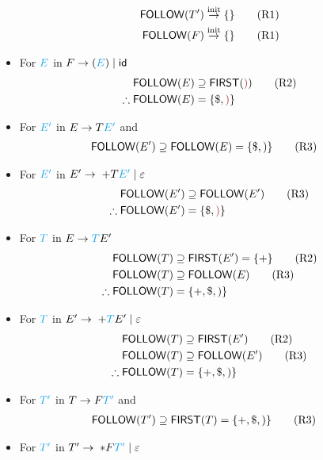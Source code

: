 \documentclass[10pt,a4paper,landscape]{article}
\begin{document}
\begin{multicols*}{3}
\begin{itemize}
\begin{align*}
    \mathsf{FOLLOW}(T') &\overset{\text{init}}{\to} \{\} \tag{R1} \\
    \mathsf{FOLLOW}(F) &\overset{\text{init}}{\to} \{\} \tag{R1} \\
  \end{align*}
\item For $\mb{E}$ in $F\to (\mb{E})\gor \mathsf{id}$
  \begin{align*}
    \mathsf{FOLLOW}(E) &\supseteq \mathsf{FIRST}(\mathtt{\mo{)}}) \tag{R2} \\
    \therefore \mathsf{FOLLOW}(E) &=\mset{\$, \mo{)}}
  \end{align*}
\item For $\mb{E'}$ in $E\to T\mb{E'}$ and
  \begin{align*}
    \mathsf{FOLLOW}(E') &\supseteq \mathsf{FOLLOW}(E) = \{\$,)\} \tag{R3}
  \end{align*}
\item For $\mb{E'}$ in $E'\to\; + T\mb{E'} \gor \varepsilon$
  \begin{align*}
    \mathsf{FOLLOW}(E') &\supseteq \mathsf{FOLLOW}(E') \tag{R3} \\
    \therefore \mathsf{FOLLOW}(E') &= \mset{\$, \mo{)} }
  \end{align*}
\item For $\mb{T}$ in $E\to \mb{T}E'$
    \begin{align*}
      \mathsf{FOLLOW}(T) &\supseteq \mathsf{FIRST}(E') = \{+\} \tag{R2} \\
      \mathsf{FOLLOW}(T) &\supseteq \mathsf{FOLLOW}(E) \tag{R3} \\
      \therefore \mathsf{FOLLOW}(T) &= \{+,\$,)\}
    \end{align*}
\item For $\mb{T}$ in $E'\to\; +\mb{T}E' \gor \varepsilon$
  \begin{align*}
    \mathsf{FOLLOW}(T) &\supseteq \mathsf{FIRST}(E') \tag{R2} \\
    \mathsf{FOLLOW}(T) &\supseteq \mathsf{FOLLOW}(E') \tag{R3} \\
    \therefore \mathsf{FOLLOW}(T) &= \{+,\$,)\}
  \end{align*}
\item For $\mb{T'}$ in $T\to F\mb{T'}$ and
  \begin{align*}
    \mathsf{FOLLOW}(T') &\supseteq \mathsf{FIRST}(T) = \{+, \$, )\} \tag{R3}
  \end{align*}
\item For $\mb{T'}$ in $T'\to\; *F\mb{T'} \gor \varepsilon$

\end{itemize}
\end{multicols*}
\end{document}
